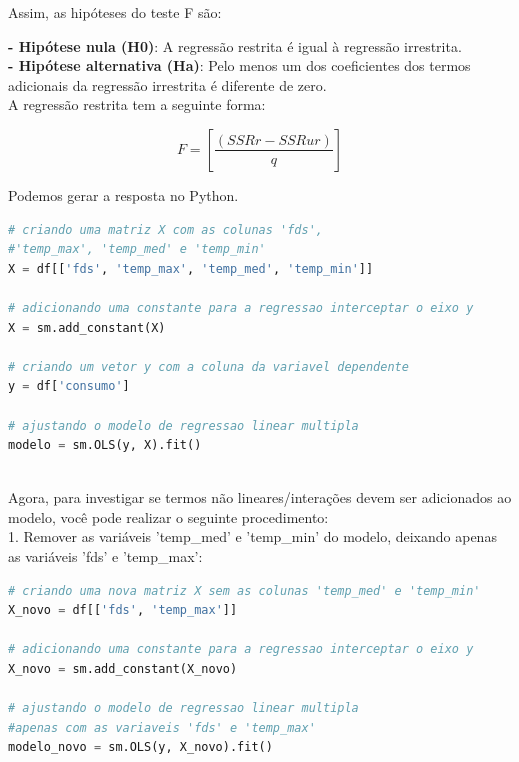 \documentclass[a4paper, 12pt]{article}
\begin{document}
Assim, as hipóteses do teste F são:

\textbf{- Hipótese nula (H0)}: A regressão restrita é igual à regressão irrestrita.\\
\textbf{- Hipótese alternativa (Ha)}: Pelo menos um dos coeficientes dos termos adicionais da regressão irrestrita é diferente de zero.\\

A regressão restrita tem a seguinte forma:

\begin{equation}
    F = [\frac{(SSRr - SSRur) }{q}]
\end{equation}


Podemos gerar a resposta no Python.

\begin{tcolorbox}[colback=white,boxrule=1pt,arc=5pt,auto outer arc]
  \begin{lstlisting}[language=Python]
# criando uma matriz X com as colunas 'fds',
#'temp_max', 'temp_med' e 'temp_min'
X = df[['fds', 'temp_max', 'temp_med', 'temp_min']]

# adicionando uma constante para a regressao interceptar o eixo y
X = sm.add_constant(X)

# criando um vetor y com a coluna da variavel dependente
y = df['consumo']

# ajustando o modelo de regressao linear multipla
modelo = sm.OLS(y, X).fit()

    \end{lstlisting}
\end{tcolorbox} \\

Agora, para investigar se termos não lineares/interações devem ser adicionados ao modelo, você pode realizar o seguinte procedimento:\\

1. Remover as variáveis 'temp\_med' e 'temp\_min' do modelo, deixando apenas as variáveis 'fds' e 'temp\_max':

\begin{tcolorbox}[colback=white,boxrule=1pt,arc=5pt,auto outer arc]
  \begin{lstlisting}[language=Python]
# criando uma nova matriz X sem as colunas 'temp_med' e 'temp_min'
X_novo = df[['fds', 'temp_max']]

# adicionando uma constante para a regressao interceptar o eixo y
X_novo = sm.add_constant(X_novo)

# ajustando o modelo de regressao linear multipla
#apenas com as variaveis 'fds' e 'temp_max'
modelo_novo = sm.OLS(y, X_novo).fit()
    \end{lstlisting}
\end{tcolorbox} \\
\end{document}
